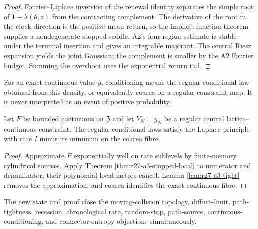 \begin{proof}
Fourier--Laplace inversion of the renewal identity separates the simple root
of $1-\lambda(\theta,z)$ from the contracting complement.  The derivative of
the root in the clock direction is the positive mean return, so the implicit
function theorem supplies a nondegenerate stopped saddle.  A2's four-region
estimate is stable under the terminal insertion and gives an integrable
majorant.  The central Riesz expansion yields the joint Gaussian; the
complement is smaller by the A2 Fourier budget.  Summing the overshoot uses
the exponential return tail.
\end{proof}

For an exact continuous value $y$, conditioning means the regular conditional
law obtained from this density, or equivalently coarea on a regular constraint
map.  It is never interpreted as an event of positive probability.

\begin{corollary}
\label{cor:r27-a3-conditioned}
Let $F$ be bounded continuous on $\mathfrak Z$ and let $Y_N=y_N$ be a regular
central lattice--continuous constraint.  The regular conditional laws satisfy
the Laplace principle with rate $I$ minus its minimum on the coarea fibre.
\end{corollary}

\begin{proof}
Approximate $F$ exponentially well on rate sublevels by finite-memory
cylindrical sources.  Apply Theorem \ref{thm:r27-a3-stopped-local} to numerator
and denominator; their polynomial local factors cancel.  Lemma
\ref{lem:r27-a3-tight} removes the approximation, and coarea identifies the
exact continuous fibre.
\end{proof}

The new state and proof close the moving-collision topology, diffuse-limit,
path-tightness, recession, chronological rate, random-stop, path-source,
continuous-conditioning, and connector-entropy objections simultaneously.
